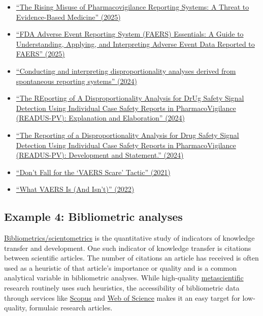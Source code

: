 \documentclass[letterpaper, 12pt]{article}
\begin{document}
\begin{itemize}
    \setlength\itemsep{-0.5em}
    \item \href{https://doi.org/10.5281/zenodo.17116884}{``The Rising Misuse of Pharmacovigilance Reporting Systems: A Threat to Evidence-Based Medicine'' (2025)}
    \item \href{https://doi.org/10.1002/cpt.3701}{``FDA Adverse Event Reporting System (FAERS) Essentials: A Guide to Understanding, Applying, and Interpreting Adverse Event Data Reported to FAERS'' (2025)}
    \item \href{https://doi.org/10.3389/fdsfr.2023.1323057}{``Conducting and interpreting disproportionality analyses derived from spontaneous reporting systems'' (2024)}
    \item \href{https://doi.org/10.1007/s40264-024-01423-7}{``The REporting of A Disproportionality Analysis for DrUg Safety Signal Detection Using Individual Case Safety Reports in PharmacoVigilance (READUS-PV): Explanation and Elaboration'' (2024)}
    \item \href{https://doi.org/10.1007/s40264-024-01421-9}{``The Reporting of a Disproportionality Analysis for Drug Safety Signal Detection Using Individual Case Safety Reports in PharmacoVigilance (READUS-PV): Development and Statement.'' (2024)}
    \item \href{https://www.mcgill.ca/oss/article/covid-19-critical-thinking-health/dont-fall-vaers-scare-tactic}{``Don’t Fall for the `VAERS Scare' Tactic'' (2021)}
    \item \href{https://publichealth.jhu.edu/2022/what-vaers-is-and-isnt}{``What VAERS Is (And Isn’t)'' (2022)}
\end{itemize}


\subsection*{Example 4: Bibliometric analyses}

\href{https://en.wikipedia.org/wiki/Bibliometrics}{Bibliometrics/scientometrics} is the quantitative study of indicators of knowledge transfer and development. One such indicator of knowledge transfer is citations between scientific articles. The number of citations an article has received is often used as a heuristic of that article's importance or quality and is a common analytical variable in bibliometric analyses. While high-quality \href{https://en.wikipedia.org/wiki/Metascience}{metascientific} research routinely uses such heuristics, the accessibility of bibliometric data through services like \href{https://scopus.com}{Scopus} and \href{/https://webofscience.com/}{Web of Science} makes it an easy target for low-quality, formulaic research articles. 
\end{document}
